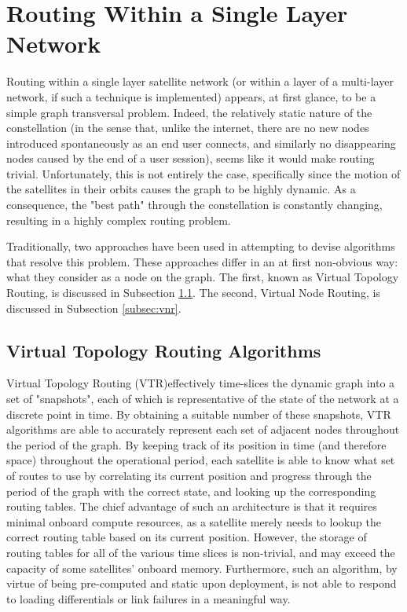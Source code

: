
\section{Routing Within a Single Layer Network}\label{sec:singleLayer}
Routing within a single layer satellite network (or within a layer of a multi-layer network, if such a technique is implemented) appears, at first glance, to be a simple graph transversal problem. Indeed, the relatively static nature of the constellation (in the sense that, unlike the internet, there are no new nodes introduced spontaneously as an end user connects, and similarly no disappearing nodes caused by the end of a user session), seems like it would make routing trivial. Unfortunately, this is not entirely the case, specifically since the motion of the satellites in their orbits causes the graph to be highly dynamic. As a consequence, the "best path" through the constellation is constantly changing, resulting in a highly complex routing problem.

Traditionally, two approaches have been used in attempting to devise algorithms that resolve this problem. These approaches differ in an at first non-obvious way: what they consider as a node on the graph. The first, known as Virtual Topology Routing, is discussed in Subsection \ref{subsec:vtr}. The second, Virtual Node Routing, is discussed in Subsection \ref{subsec:vnr}.

\subsection{Virtual Topology Routing Algorithms}\label{subsec:vtr}
Virtual Topology Routing (VTR)effectively time-slices the dynamic graph into a set of "snapshots", each of which is representative of the state of the network at a discrete point in time. By obtaining a suitable number of these snapshots, VTR algorithms are able to accurately represent each set of adjacent nodes throughout the period of the graph. By keeping track of its position in time (and therefore space) throughout the operational period, each satellite is able to know what set of routes to use by correlating its current position and progress through the period of the graph with the correct state, and looking up the corresponding routing tables. The chief advantage of such an architecture is that it requires minimal onboard compute resources, as a satellite merely needs to lookup the correct routing table based on its current position. However, the storage of routing tables for all of the various time slices is non-trivial, and may exceed the capacity of some satellites' onboard memory. Furthermore, such an algorithm, by virtue of being pre-computed and static upon deployment, is not able to respond to loading differentials or link failures in a meaningful way.

